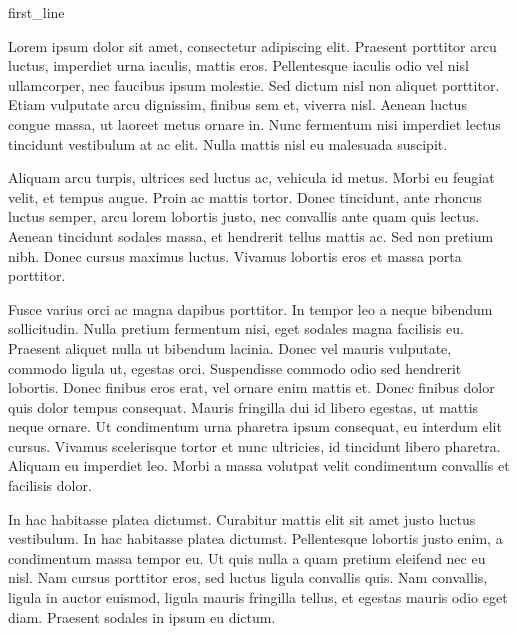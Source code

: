 \documentclass[
	a4paper, %
	10pt, %
]{CSMinimalMemo}
\begin{document}
\outputheader %


{{ first_line }}

Lorem ipsum dolor sit amet, consectetur adipiscing elit. Praesent porttitor arcu luctus, imperdiet urna iaculis, mattis eros. Pellentesque iaculis odio vel nisl ullamcorper, nec faucibus ipsum molestie. Sed dictum nisl non aliquet porttitor. Etiam vulputate arcu dignissim, finibus sem et, viverra nisl. Aenean luctus congue massa, ut laoreet metus ornare in. Nunc fermentum nisi imperdiet lectus tincidunt vestibulum at ac elit. Nulla mattis nisl eu malesuada suscipit.

Aliquam arcu turpis, ultrices sed luctus ac, vehicula id metus. Morbi eu feugiat velit, et tempus augue. Proin ac mattis tortor. Donec tincidunt, ante rhoncus luctus semper, arcu lorem lobortis justo, nec convallis ante quam quis lectus. Aenean tincidunt sodales massa, et hendrerit tellus mattis ac. Sed non pretium nibh. Donec cursus maximus luctus. Vivamus lobortis eros et massa porta porttitor.

Fusce varius orci ac magna dapibus porttitor. In tempor leo a neque bibendum sollicitudin. Nulla pretium fermentum nisi, eget sodales magna facilisis eu. Praesent aliquet nulla ut bibendum lacinia. Donec vel mauris vulputate, commodo ligula ut, egestas orci. Suspendisse commodo odio sed hendrerit lobortis. Donec finibus eros erat, vel ornare enim mattis et. Donec finibus dolor quis dolor tempus consequat. Mauris fringilla dui id libero egestas, ut mattis neque ornare. Ut condimentum urna pharetra ipsum consequat, eu interdum elit cursus. Vivamus scelerisque tortor et nunc ultricies, id tincidunt libero pharetra. Aliquam eu imperdiet leo. Morbi a massa volutpat velit condimentum convallis et facilisis dolor.

In hac habitasse platea dictumst. Curabitur mattis elit sit amet justo luctus vestibulum. In hac habitasse platea dictumst. Pellentesque lobortis justo enim, a condimentum massa tempor eu. Ut quis nulla a quam pretium eleifend nec eu nisl. Nam cursus porttitor eros, sed luctus ligula convallis quis. Nam convallis, ligula in auctor euismod, ligula mauris fringilla tellus, et egestas mauris odio eget diam. Praesent sodales in ipsum eu dictum.
\end{document}
